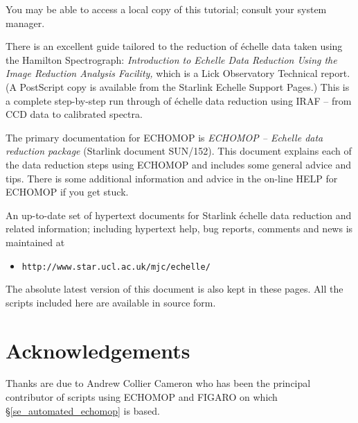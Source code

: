 \documentclass[twoside,11pt]{article}
\newcommand{\stardocinitials}  {SC}
\newcommand{\stardocnumber}    {3.2-0} %
\newcommand{\stardocname}{\stardocinitials /\stardocnumber}
\newcommand{\htmladdnormallink}[2]{#1}
\newcommand{\htmlref}[2]{#1}
\newenvironment{latexonly}{}{}
\newcommand{\xref}[3]{#1}
\newcommand{\xlabel}[1]{}
\renewcommand{\_}{\texttt{\symbol{95}}}
\newcommand{\scspec}[2]{#1}
\newcommand{\scspec}[2]{#2}
\newcommand{\EchelleHomePage}{http://www.starlink.ac.uk/echomop/echelle/}
\begin{document}
You may be able to access a local copy of this tutorial; consult your
system manager.

There is an excellent guide tailored to the reduction of \'{e}chelle
data taken using the Hamilton Spectrograph:
\htmladdnormallink{{\sl Introduction to Echelle
Data Reduction  Using the Image Reduction Analysis Facility,}}
{\EchelleHomePage/misc/LickTech74.ps.gz}
which is a
Lick Observatory Technical report\@.
\begin{latexonly}
(A PostScript copy is available from the Starlink Echelle Support
Pages.)
\end{latexonly}
This is a complete
step-by-step run through of \'{e}chelle data reduction using IRAF
\scspec{--}{-} from CCD data to calibrated spectra.

The primary documentation for ECHOMOP is \xref{{\sl ECHOMOP
\scspec{--}{-} Echelle
data reduction package} (Starlink document SUN/152)}{sun152}{}\@.
This document explains each of the data reduction steps using ECHOMOP and
includes some general advice and tips.
There is some additional information and advice in the on-line HELP for
ECHOMOP if you get stuck.

An up-to-date set of hypertext documents for Starlink \'{e}chelle data
reduction and related information; including hypertext help, bug
reports, comments and news is maintained at

\begin{itemize}

\item \scspec{{\tt http://www.star.ucl.ac.uk/mjc/echelle/}}
      {\htmladdnormallink{\verb+http://www.star.ucl.ac.uk/~mjc/echelle/+}
      {http://www.star.ucl.ac.uk/~mjc/echelle/}}

\end{itemize}

The absolute latest version of this document is also kept in these pages.
All the scripts included here are available in source form.


\section{\label{se_acknowledgements}\xlabel{acknowledgements}Acknowledgements }
\markboth{Acknowledgements}{\stardocname}

Thanks are due to Andrew Collier Cameron who has been the principal
contributor of scripts using ECHOMOP and FIGARO on which
\scspec{\S\ref{se_automated_echomop} is}
{the \htmlref{automated reductions}{se_automated_echomop} are}
based.
\end{document}
